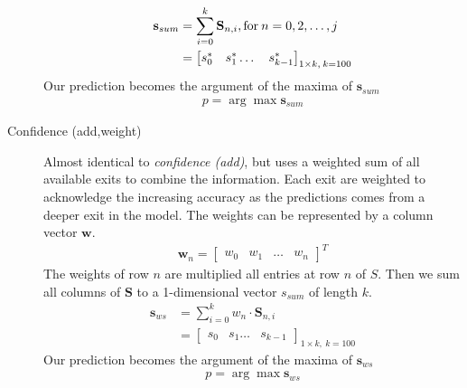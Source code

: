 \begin{description}
	\begin{align*}
		\mathbf{s}_{sum} &= \sum_{i=0}^{k} \mathbf{S}_{n,i}, \text{for\:} n=0, 2, \dots, j\\ 
		&=	\begin{bmatrix}
		s^*_0 & s^*_1 \dots & s^*_{k-1}
		\end{bmatrix}_{1 \times k,\: k=100} 
	\end{align*}
	Our prediction becomes the argument of the maxima of $\mathbf{s}_{sum}$
	\begin{align*}
		p = \arg \max \mathbf{s}_{sum}
	\end{align*}
		

	\item[Confidence (add,weight)] Almost identical to \emph{confidence (add)}, but uses a weighted sum of all available exits to combine the information. Each exit are weighted to acknowledge the increasing accuracy as the predictions comes from a deeper exit in the model.  The weights can be represented by a column vector $\mathbf{w}$.
	\begin{align*}
		\mathbf{w}_{n} =
		\begin{bmatrix}
			w_0 &
			w_1 &
			\dots &
			w_n
		\end{bmatrix}^T
	\end{align*}
	The weights of row $n$ are multiplied all entries at row $n$ of $S$. Then we sum all columns of $\mathbf{S}$ to a 1-dimensional vector $s_{sum}$ of length $k$.  
	\begin{align*}
	\mathbf{s}_{ws} &= \sum_{i=0}^{k} w_n \cdot \mathbf{S}_{n,i}\\
	&= 		
	\begin{bmatrix}
	s_0 & s_1 \dots & s_{k-1}
	\end{bmatrix}_{1 \times k,\: k=100} 
	\end{align*}
	Our prediction becomes the argument of the maxima of $\mathbf{s}_{ws}$
	\begin{align*}
	p = \arg \max \mathbf{s}_{ws}
	\end{align*}
	

\end{description}
